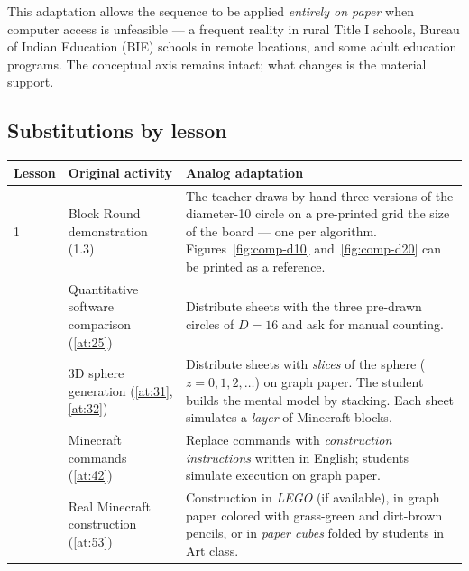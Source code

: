 \documentclass[12pt,a4paper]{scrartcl}
\begin{document}
This adaptation allows the sequence to be applied \emph{entirely on paper} when computer access is unfeasible --- a frequent reality in rural Title I schools, Bureau of Indian Education (BIE) schools in remote locations, and some adult education programs. The conceptual axis remains intact; what changes is the material support.

\subsection{Substitutions by lesson}

\begin{center}
\small
\begin{tabularx}{\textwidth}{@{}p{}p{}X@{}}
\toprule
\textbf{Lesson} & \textbf{Original activity} & \textbf{Analog adaptation} \\
\midrule
1 & Block Round demonstration (1.3) & The teacher draws by hand three versions of the diameter-10 circle on a pre-printed grid the size of the board --- one per algorithm. Figures~\ref{fig:comp-d10} and~\ref{fig:comp-d20} can be printed as a reference. \\
\addlinespace[3pt]
2 & Quantitative software comparison (\ref{at:25}) & Distribute sheets with the three pre-drawn circles of $D = 16$ and ask for manual counting. \\
\addlinespace[3pt]
3 & 3D sphere generation (\ref{at:31}, \ref{at:32}) & Distribute sheets with \emph{slices} of the sphere ($z = 0, 1, 2, \ldots$) on graph paper. The student builds the mental model by stacking. Each sheet simulates a \emph{layer} of Minecraft blocks. \\
\addlinespace[3pt]
4 & Minecraft commands (\ref{at:42}) & Replace commands with \emph{construction instructions} written in English; students simulate execution on graph paper. \\
\addlinespace[3pt]
5 & Real Minecraft construction (\ref{at:53}) & Construction in \emph{LEGO} (if available), in graph paper colored with grass-green and dirt-brown pencils, or in \emph{paper cubes} folded by students in Art class. \\
\bottomrule
\end{tabularx}
\end{center}
\end{document}
